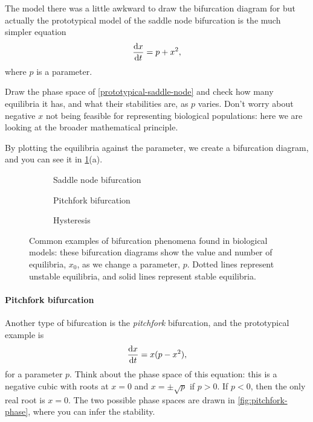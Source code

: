 \documentclass[main.tex]{subfiles}
\begin{document}
The model there was a little awkward to draw the bifurcation diagram for but actually the prototypical model of the saddle node bifurcation is the much simpler equation
\begin{equation}
	\label{prototypical-saddle-node}
    \fd{x}{t} = p+x^2,
\end{equation}
where $p$ is a parameter. 
\begin{do-it-yourself}
Draw the phase space of \cref{prototypical-saddle-node} and check how many equilibria it has, and what their stabilities are, as $p$ varies. Don't worry about negative $x$ not being feasible for representing biological populations: here we are looking at the broader mathematical principle.
\end{do-it-yourself}
By plotting the equilibria against the parameter, we create a bifurcation diagram, and you can see it in \cref{fig:1D_Bif_diagrams}(a).

\begin{figure}
\centering
\begin{subfigure}[t]{0.30\textwidth}
	\centering
	
	\caption{Saddle node bifurcation}
\end{subfigure}
\begin{subfigure}[t]{0.32\textwidth}
	\centering
	
	\caption{Pitchfork bifurcation}
\end{subfigure}
\begin{subfigure}[t]{0.32\textwidth}
	\centering
	
	\caption{Hysteresis}
\end{subfigure}
\caption{Common examples of bifurcation phenomena found in biological models: these bifurcation diagrams show the value and number of equilibria, $x_0$, as we change a parameter, $p$. Dotted lines represent unstable equilibria, and solid lines represent stable equilibria.}%
\label{fig:1D_Bif_diagrams}%
\end{figure}

\paragraph{Pitchfork bifurcation} Another type of bifurcation is the \emph{pitchfork} bifurcation, and the prototypical example is
\begin{equation}
	\label{prototypical-pitchfork}
	\fd{x}{t} = x(p - x^2),
\end{equation}
for a parameter $p$. Think about the phase space of this equation: this is a negative cubic with roots at $x=0$ and $x=\pm\sqrt{p}$ if $p>0$. If $p<0$, then the only real root is $x=0$. The two possible phase spaces are drawn in \cref{fig:pitchfork-phase}, where you can infer the stability.
\end{document}
